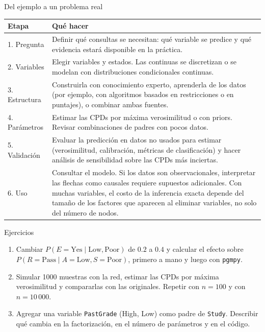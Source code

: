 \documentclass[11pt]{beamer}
\newcommand{\Pp}[1]{P\!\left(#1\right)}
\begin{document}
\begin{frame}{Del ejemplo a un problema real}
  \footnotesize
  \begin{tabular}{p{}p{}}
    \toprule
    Etapa & Qué hacer \\
    \midrule
    1. Pregunta & Definir qué consultas se necesitan: qué variable se predice y qué evidencia estará disponible en la práctica. \\
    2. Variables & Elegir variables y estados. Las continuas se discretizan o se modelan con distribuciones condicionales continuas. \\
    3. Estructura & Construirla con conocimiento experto, aprenderla de los datos (por ejemplo, con algoritmos basados en restricciones o en puntajes), o combinar ambas fuentes. \\
    4. Parámetros & Estimar las CPDs por máxima verosimilitud o con priors. Revisar combinaciones de padres con pocos datos. \\
    5. Validación & Evaluar la predicción en datos no usados para estimar (verosimilitud, calibración, métricas de clasificación) y hacer análisis de sensibilidad sobre las CPDs más inciertas. \\
    6. Uso & Consultar el modelo. Si los datos son observacionales, interpretar las flechas como causales requiere supuestos adicionales. Con muchas variables, el costo de la inferencia exacta depende del tamaño de los factores que aparecen al eliminar variables, no solo del número de nodos. \\
    \bottomrule
  \end{tabular}
\end{frame}

\begin{frame}{Ejercicios}
  \begin{enumerate}
    \item Cambiar $\Pp{E=\text{Yes}\mid\text{Low},\text{Poor}}$ de $0.2$ a $0.4$ y calcular el efecto sobre $\Pp{R=\text{Pass}\mid A=\text{Low},S=\text{Poor}}$, primero a mano y luego con \texttt{pgmpy}.
    \item Simular 1000 muestras con la red, estimar las CPDs por máxima verosimilitud y compararlas con las originales. Repetir con $n=100$ y con $n=10\,000$.
    \item Agregar una variable \texttt{PastGrade} (High, Low) como padre de \texttt{Study}. Describir qué cambia en la factorización, en el número de parámetros y en el código.
  \end{enumerate}
\end{frame}
\end{document}
